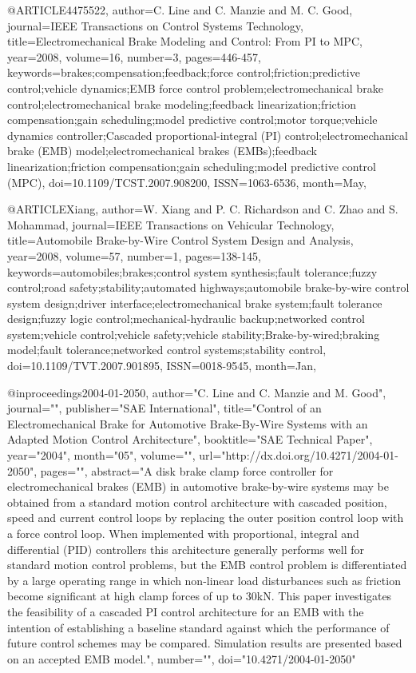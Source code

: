 @ARTICLE{4475522, 
author={C. Line and C. Manzie and M. C. Good}, 
journal={IEEE Transactions on Control Systems Technology}, 
title={Electromechanical Brake Modeling and Control: From PI to MPC}, 
year={2008}, 
volume={16}, 
number={3}, 
pages={446-457}, 
keywords={brakes;compensation;feedback;force control;friction;predictive control;vehicle dynamics;EMB force control problem;electromechanical brake control;electromechanical brake modeling;feedback linearization;friction compensation;gain scheduling;model predictive control;motor torque;vehicle dynamics controller;Cascaded proportional-integral (PI) control;electromechanical brake (EMB) model;electromechanical brakes (EMBs);feedback linearization;friction compensation;gain scheduling;model predictive control (MPC)}, 
doi={10.1109/TCST.2007.908200}, 
ISSN={1063-6536}, 
month={May},}


@ARTICLE{Xiang, 
author={W. Xiang and P. C. Richardson and C. Zhao and S. Mohammad}, 
journal={IEEE Transactions on Vehicular Technology}, 
title={Automobile Brake-by-Wire Control System Design and Analysis}, 
year={2008}, 
volume={57}, 
number={1}, 
pages={138-145}, 
keywords={automobiles;brakes;control system synthesis;fault tolerance;fuzzy control;road safety;stability;automated highways;automobile brake-by-wire control system design;driver interface;electromechanical brake system;fault tolerance design;fuzzy logic control;mechanical-hydraulic backup;networked control system;vehicle control;vehicle safety;vehicle stability;Brake-by-wired;braking model;fault tolerance;networked control systems;stability control}, 
doi={10.1109/TVT.2007.901895}, 
ISSN={0018-9545}, 
month={Jan},}

@inproceedings{2004-01-2050, 
author="C. Line and C. Manzie and M. Good",  
journal="",  
publisher="SAE International",  
title="Control of an Electromechanical Brake for Automotive Brake-By-Wire Systems with an Adapted Motion Control Architecture",  
booktitle="SAE Technical Paper",
year="2004",  
month="05",  
volume="",  
url="http://dx.doi.org/10.4271/2004-01-2050",  
pages="",  
abstract="A disk brake clamp force controller for electromechanical brakes (EMB) in automotive brake-by-wire systems may be obtained from a standard motion control architecture with cascaded position, speed and current control loops by replacing the outer position control loop with a force control loop. When implemented with proportional, integral and differential (PID) controllers this architecture generally performs well for standard motion control problems, but the EMB control problem is differentiated by a large operating range in which non-linear load disturbances such as friction become significant at high clamp forces of up to 30kN. This paper investigates the feasibility of a cascaded PI control architecture for an EMB with the intention of establishing a baseline standard against which the performance of future control schemes may be compared. Simulation results are presented based on an accepted EMB model.",  
number="",  
doi="10.4271/2004-01-2050"  
} 

